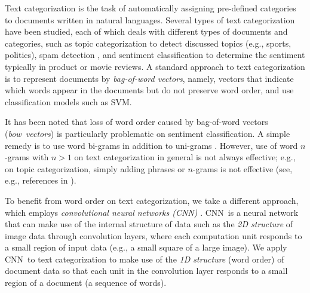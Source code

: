 \documentclass[11pt,letterpaper]{article}
\newcommand{\cnn}{CNN}
\newcommand{\bow}{{bow}}
\begin{document}
Text categorization is the task of automatically assigning pre-defined categories to 
documents written in natural languages.  
Several types of text categorization have been studied, each of which deals with 
different types of documents and categories, 
such as topic categorization to detect discussed topics (e.g., sports, politics), 
spam detection \cite{SDHH98}, %
and sentiment classification \cite{PLV02,PL08,MDPHNP11} 
to determine %
the sentiment typically in product or movie reviews.  
%
A standard approach to text categorization 
is to represent documents by {\em bag-of-word vectors}, 
namely, vectors that indicate which words appear in the documents but do not preserve
word order, and use classification models such as %
SVM. %

It has been noted that loss of word order caused by bag-of-word vectors 
({\em \bow\ vectors}) is particularly problematic on sentiment classification.  
A simple remedy is to use word bi-grams in addition to uni-grams 
\cite{BDP07,GBB11,WM12}. 
However, 
use of word $n$-grams with $n>1$ on text categorization in general is not always 
effective; e.g.,   
on topic categorization, simply adding phrases or $n$-grams 
is not effective (see, e.g., references in \cite{TWL02}).  

To benefit from word order on text categorization, 
we take a different approach, 
which employs {\em convolutional neural networks (\cnn)}
\cite{LeCun+etal98}. 
\cnn\ is a neural network that can make use of the internal structure of data 
such as the {\em 2D structure} of image data through convolution layers, 
where each computation unit responds to a small region of input data 
(e.g., a small square of a large image).  We apply \cnn\ to text 
categorization to make use of the {\em 1D structure} (word order) 
of document data so that each unit in the convolution layer responds to 
a small region of a document (a sequence of words).
\end{document}
